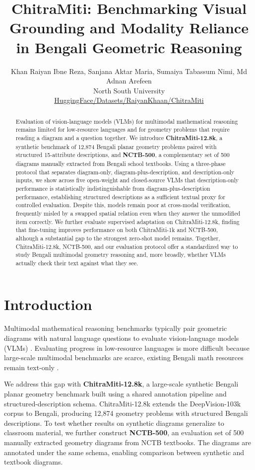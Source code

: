 \documentclass[11pt]{article}
\title{\textbf{ChitraMiti: Benchmarking Visual Grounding and Modality Reliance in
       Bengali Geometric Reasoning}}
\author{
  Khan Raiyan Ibne Reza, \enspace Sanjana Aktar Maria, \enspace Sumaiya Tabassum Nimi, \enspace Md Adnan Arefeen \\
  \textmd{North South University} \\[2.5pt]
  \href{https://huggingface.co/datasets/RaiyanKhaan/ChitraMiti}{\color{blue}\textmd{HuggingFace/Datasets/RaiyanKhaan/ChitraMiti}}
}
\date{}
\begin{document}
\maketitle

\begin{abstract}
Evaluation of vision-language models (VLMs) for multimodal mathematical reasoning remains limited for low-resource languages and for geometry problems that require reading a diagram and a question together. We introduce \textbf{ChitraMiti-12.8k}, a synthetic benchmark of 12,874 Bengali planar geometry problems paired with structured 15-attribute descriptions, and \textbf{NCTB-500}, a complementary set of 500 diagrams manually extracted from Bengali school textbooks. Using a three-phase protocol that separates diagram-only, diagram-plus-description, and description-only inputs, we show across five open-weight and closed-source VLMs that description-only performance is statistically indistinguishable from diagram-plus-description performance, establishing structured descriptions as a sufficient textual proxy for controlled evaluation. Despite this, models remain poor at cross-modal verification, frequently misled by a swapped spatial relation even when they answer the unmodified item correctly. We further evaluate supervised adaptation on ChitraMiti-12.8k, finding that fine-tuning improves performance on both ChitraMiti-1k and NCTB-500, although a substantial gap to the strongest zero-shot model remains. Together, ChitraMiti-12.8k, NCTB-500, and our evaluation protocol offer a standardized way to study Bengali multimodal geometry reasoning and, more broadly, whether VLMs actually check their text against what they see.
\end{abstract}

\section{Introduction}
\label{sec:introduction}

Multimodal mathematical reasoning benchmarks typically pair geometric diagrams with natural language questions to evaluate vision-language models (VLMs) \citep{lu2024mathvista}. Evaluating progress in low-resource languages is more difficult because large-scale multimodal benchmarks are scarce, existing Bengali math resources remain text-only \citep{hasan2021xl, bhattacharjee2023banglanlg, prama2025banglamath}.

We address this gap with \textbf{ChitraMiti-12.8k}, a large-scale synthetic Bengali planar geometry benchmark built using a shared annotation pipeline and structured-description schema. ChitraMiti-12.8k extends the DeepVision-103k corpus \citep{sun2026deepvision} to Bengali, producing 12,874 geometry problems with structured Bengali descriptions. To test whether results on synthetic diagrams generalize to classroom material, we further construct \textbf{NCTB-500}, an evaluation set of 500 manually extracted geometry diagrams from NCTB textbooks. The diagrams are annotated under the same schema, enabling comparison between synthetic and textbook diagrams.
\end{document}
